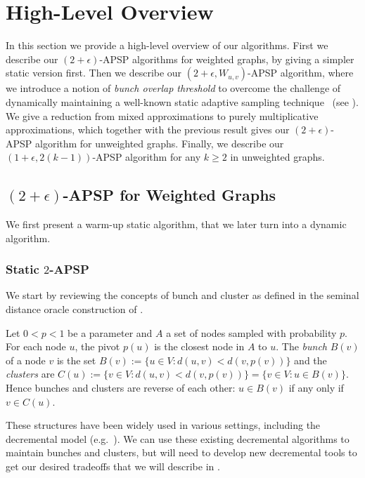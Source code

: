 \documentclass[11pt]{article}
\theoremstyle{definition}
\theoremstyle{remark}
\begin{document}
\section{High-Level Overview}
 In this section we provide a high-level overview of our algorithms. First we describe our $(2+\epsilon)$-APSP algorithms for weighted graphs, by giving a simpler static version first. Then we describe our $(2+\epsilon,W_{u,v})$-APSP algorithm, where we introduce a notion of \emph{bunch overlap threshold} to overcome the challenge of dynamically maintaining a well-known static adaptive sampling technique~\cite{TZ01} (see ). 
 We give a reduction from mixed approximations to purely multiplicative approximations, which together with the previous result gives our $(2+\epsilon)$-APSP algorithm for unweighted graphs. 
Finally, we describe our $(1+\epsilon, 2(k-1))$-APSP algorithm for any $k \geq 2$ in unweighted graphs. 



\subsection{\texorpdfstring{$(2+\epsilon)$}{(2+epsilon)}-APSP for Weighted Graphs}\label{sc:high-level_2approx} 
We first present a warm-up static algorithm, that we later turn into a dynamic algorithm. 

\subsubsection{Static \texorpdfstring{$2$}{2}-APSP} 
We start by reviewing the concepts of bunch and cluster as defined in the seminal distance oracle construction of \cite{TZ2005}.

Let $0<p <1$ be a parameter and $A$ a set of nodes sampled with probability $p$. For each node $u$, the pivot $p(u)$ is the closest node in $A$ to $u$. The \textit{bunch} $B(v)$ of a node $v$ is the set $B(v):=\{ u \in V : d(u,v) < d(v,p(v)) \}$ and the \textit{clusters} are $C(u):= \{ v \in V: d(u,v) < d(v,p(v)) \}=\{v \in V: u\in B(v)\}$. Hence bunches and clusters are reverse of each other: $u \in B(v)$ if any only if $v \in C(u)$.

 These structures have been widely used in various settings, including the decremental model (e.g.~\cite{HKN2016, RodittyZ11, LN2020, Chechik18}). We can use these existing decremental algorithms to maintain bunches and clusters, but will need to develop new decremental tools to get our desired tradeoffs that we will describe in .
\end{document}
